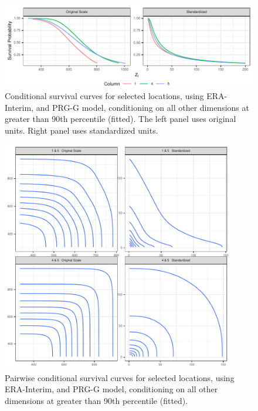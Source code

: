 \begin{figure}[htb]
    \centering
    \caption{Conditional survival curves for selected locations, using ERA-Interim, and PRG-G model,  conditioning on all other dimensions at greater than 90th percentile (fitted)\label{fig:condsurv1d}. The left panel uses original units. Right panel uses standardized units.}
    \includegraphics[width=\linewidth]{./images/condsurv_1d}
\end{figure}

\begin{figure}[htb]
    \centering
    \caption{Pairwise conditional survival curves for selected locations, using 
        ERA-Interim, and PRG-G model, conditioning on all other dimensions at greater 
        than 90th percentile (fitted).\label{fig:condsurv2d}}
    \includegraphics[height=4in, width=4in]{./images/condsurv_2d}
\end{figure}

